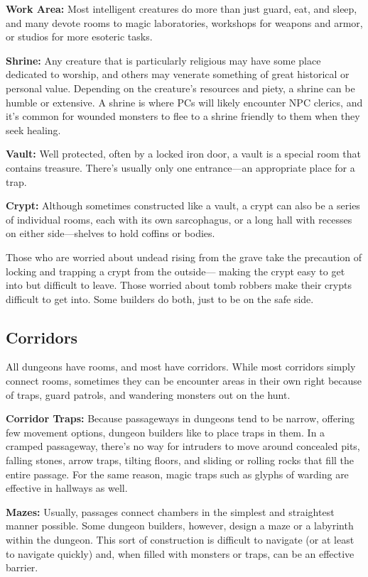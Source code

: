 \textbf{Work Area:} Most intelligent creatures do more than just guard, eat, and sleep, and many devote rooms to magic laboratories, workshops for weapons and armor, or studios for more esoteric tasks.

\textbf{Shrine:} Any creature that is particularly religious may have some place dedicated to worship, and others may venerate something of great historical or personal value. Depending on the creature's resources and piety, a shrine can be humble or extensive. A shrine is where PCs will likely encounter NPC clerics, and it's common for wounded monsters to flee to a shrine friendly to them when they seek healing.

\textbf{Vault:} Well protected, often by a locked iron door, a vault is a special room that contains treasure. There's usually only one entrance---an appropriate place for a trap.

\textbf{Crypt:} Although sometimes constructed like a vault, a crypt can also be a series of individual rooms, each with its own sarcophagus, or a long hall with recesses on either side---shelves to hold coffins or bodies.

Those who are worried about undead rising from the grave take the precaution of locking and trapping a crypt from the outside--- making the crypt easy to get into but difficult to leave. Those worried about tomb robbers make their crypts difficult to get into. Some builders do both, just to be on the safe side.

\subsection{Corridors}
All dungeons have rooms, and most have corridors. While most corridors simply connect rooms, sometimes they can be encounter areas in their own right because of traps, guard patrols, and wandering monsters out on the hunt.

\textbf{Corridor Traps:} Because passageways in dungeons tend to be narrow, offering few movement options, dungeon builders like to place traps in them. In a cramped passageway, there's no way for intruders to move around concealed pits, falling stones, arrow traps, tilting floors, and sliding or rolling rocks that fill the entire passage. For the same reason, magic traps such as glyphs of warding are effective in hallways as well.

\textbf{Mazes:} Usually, passages connect chambers in the simplest and straightest manner possible. Some dungeon builders, however, design a maze or a labyrinth within the dungeon. This sort of construction is difficult to navigate (or at least to navigate quickly) and, when filled with monsters or traps, can be an effective barrier.

